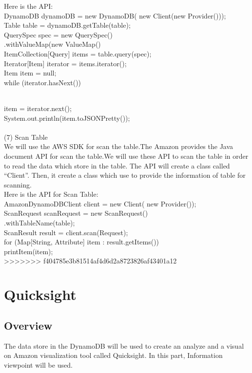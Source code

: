     Here is the API\cite{w2}:\\
    DynamoDB dynamoDB = new DynamoDB(
    new Client(new Provider()));\\
    Table table = dynamoDB.getTable(table);\\
    QuerySpec spec = new QuerySpec()\\
    .withValueMap(new ValueMap()\\
    ItemCollection[Query] items = table.query(spec);\\
    Iterator[Item] iterator = items.iterator();\\
    Item item = null;\\
    while (iterator.hasNext()) {\\
    item = iterator.next();\\
    System.out.println(item.toJSONPretty());\\
\\
    (7) Scan Table \\
    We will use the AWS SDK for scan the table.The Amazon provides the Java document API for scan the table.We will use these API to scan the table in order to read the data which store in the table. The API will create a class called “Client”. Then, it create a class which use to provide the information of table for scanning.\\
    Here is the API for Scan Table\cite{w3}:\\
    AmazonDynamoDBClient client = new Client(
    new Provider());\\
    ScanRequest scanRequest = new ScanRequest()\\
    .withTableName(table);\\
    ScanResult result = client.scan(Request);\\
    for (Map[String, Attribute] item : result.getItems()){\\
    printItem(item);}\\
>>>>>>> f404785e3b81514af4d6d2a8723826af43401a12
\section{Quicksight}
    \subsection{Overview}
    The data store in the DynamoDB will be used to create an analyze and a visual on Amazon visualization tool called Quicksight. In this part, Information viewpoint will be used.
}
